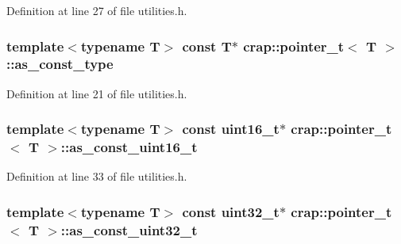 Definition at line 27 of file utilities.\+h.

\hypertarget{structcrap_1_1pointer__t_af40ed86c734355aefae597dd8882386c}{
\subsubsection[{as\+\_\+const\+\_\+type}]{\setlength{\rightskip}{0pt plus 5cm}template$<$typename T$>$ const T$\ast$ {\bf crap\+::pointer\+\_\+t}$<$ T $>$\+::as\+\_\+const\+\_\+type}}\label{structcrap_1_1pointer__t_af40ed86c734355aefae597dd8882386c}


Definition at line 21 of file utilities.\+h.

\hypertarget{structcrap_1_1pointer__t_a7404877008ee5b52b04d2278c02987ed}{
\subsubsection[{as\+\_\+const\+\_\+uint16\+\_\+t}]{\setlength{\rightskip}{0pt plus 5cm}template$<$typename T$>$ const uint16\+\_\+t$\ast$ {\bf crap\+::pointer\+\_\+t}$<$ T $>$\+::as\+\_\+const\+\_\+uint16\+\_\+t}}\label{structcrap_1_1pointer__t_a7404877008ee5b52b04d2278c02987ed}


Definition at line 33 of file utilities.\+h.

\hypertarget{structcrap_1_1pointer__t_a93e98760d5f987b6eefc1b96a5b7d00d}{
\subsubsection[{as\+\_\+const\+\_\+uint32\+\_\+t}]{\setlength{\rightskip}{0pt plus 5cm}template$<$typename T$>$ const uint32\+\_\+t$\ast$ {\bf crap\+::pointer\+\_\+t}$<$ T $>$\+::as\+\_\+const\+\_\+uint32\+\_\+t}}\label{structcrap_1_1pointer__t_a93e98760d5f987b6eefc1b96a5b7d00d}


